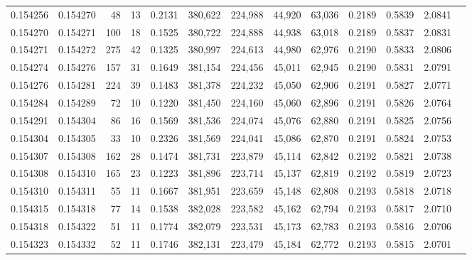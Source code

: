 \begin{tabular}{rrrrrrrrrrrrr}
0.154256 & 0.154270 &    48 &  13 &                                     0.2131 & 380,622 & 224,988 &  44,920 &  63,036 & 0.2189 & 0.5839 & 2.0841 \\
0.154270 & 0.154271 &   100 &  18 &                                     0.1525 & 380,722 & 224,888 &  44,938 &  63,018 & 0.2189 & 0.5837 & 2.0831 \\
0.154271 & 0.154272 &   275 &  42 &                                     0.1325 & 380,997 & 224,613 &  44,980 &  62,976 & 0.2190 & 0.5833 & 2.0806 \\
0.154274 & 0.154276 &   157 &  31 &                                     0.1649 & 381,154 & 224,456 &  45,011 &  62,945 & 0.2190 & 0.5831 & 2.0791 \\
0.154276 & 0.154281 &   224 &  39 &                                     0.1483 & 381,378 & 224,232 &  45,050 &  62,906 & 0.2191 & 0.5827 & 2.0771 \\
0.154284 & 0.154289 &    72 &  10 &                                     0.1220 & 381,450 & 224,160 &  45,060 &  62,896 & 0.2191 & 0.5826 & 2.0764 \\
0.154291 & 0.154304 &    86 &  16 &                                     0.1569 & 381,536 & 224,074 &  45,076 &  62,880 & 0.2191 & 0.5825 & 2.0756 \\
0.154304 & 0.154305 &    33 &  10 &                                     0.2326 & 381,569 & 224,041 &  45,086 &  62,870 & 0.2191 & 0.5824 & 2.0753 \\
0.154307 & 0.154308 &   162 &  28 &                                     0.1474 & 381,731 & 223,879 &  45,114 &  62,842 & 0.2192 & 0.5821 & 2.0738 \\
0.154308 & 0.154310 &   165 &  23 &                                     0.1223 & 381,896 & 223,714 &  45,137 &  62,819 & 0.2192 & 0.5819 & 2.0723 \\
0.154310 & 0.154311 &    55 &  11 &                                     0.1667 & 381,951 & 223,659 &  45,148 &  62,808 & 0.2193 & 0.5818 & 2.0718 \\
0.154315 & 0.154318 &    77 &  14 &                                     0.1538 & 382,028 & 223,582 &  45,162 &  62,794 & 0.2193 & 0.5817 & 2.0710 \\
0.154318 & 0.154322 &    51 &  11 &                                     0.1774 & 382,079 & 223,531 &  45,173 &  62,783 & 0.2193 & 0.5816 & 2.0706 \\
0.154323 & 0.154332 &    52 &  11 &                                     0.1746 & 382,131 & 223,479 &  45,184 &  62,772 & 0.2193 & 0.5815 & 2.0701 \\

\end{tabular}
